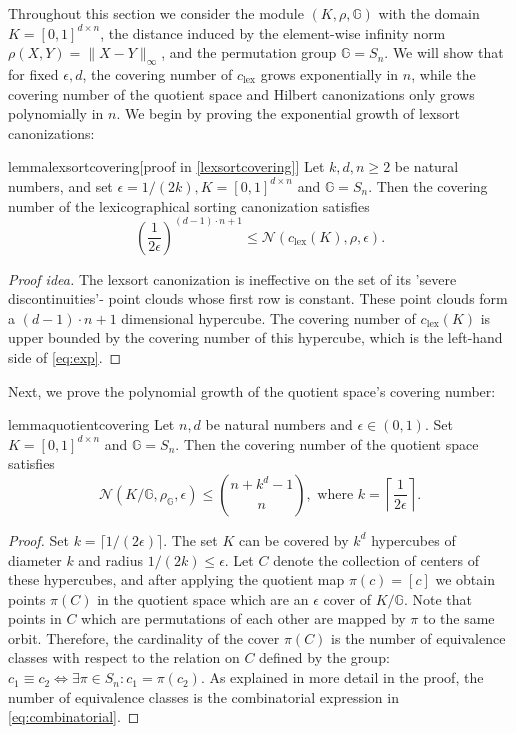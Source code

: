 \documentclass{article}
\theoremstyle{definition}
\theoremstyle{plain}
\newcommand{\G}{\mathbb{G}}
\newcommand{\N}{\mathcal{N}}
\newcommand{\csort}{c_{\mathrm{lex}}}
\begin{document}
Throughout this section we consider the module $(K,\rho,\G) $ with the domain $K=[0,1]^{d\times n}$, the distance induced by the element-wise infinity norm $\rho(X,Y)=\|X-Y\|_\infty $, and the permutation group $\G=S_n$. We  will show that for fixed $\epsilon,d$, the covering number of $\csort$ grows exponentially in $n$, while the covering number of the quotient space and Hilbert canonizations only grows polynomially in $n$. We begin by proving the exponential growth of lexsort canonizations:

\begin{restatable}{lemma}{lexsortcovering}[proof in \ref{lexsortcovering}]
\label{lem:lexsortcovering}
Let $k,d,n\geq 2$ be natural numbers, and set $\epsilon=1/(2k), K=[0,1]^{d\times n}$ and $\G=S_n$.    Then the covering number of the lexicographical sorting canonization satisfies 
\begin{equation}\label{eq:exp}\left( \frac{1}{2\epsilon}\right)^{(d-1)\cdot n + 1}\leq \N(\csort(K),\rho,\epsilon).\end{equation}
\end{restatable}
\begin{proof}[Proof idea]
The lexsort canonization is ineffective on the set of its 'severe discontinuities'- point clouds whose first row is constant. These point clouds form a $(d-1)\cdot n+1 $ dimensional hypercube. The covering number of $\csort(K)$ is upper bounded by the covering number of this hypercube, which is the left-hand side of \eqref{eq:exp}.
\end{proof}
Next, we prove the polynomial growth of the quotient space's covering number:
\begin{restatable}{lemma}{quotientcovering}
\label{lem:quotient_covering}
Let $n,d$ be natural numbers and $\epsilon\in (0,1)$. Set $K=[0,1]^{d\times n}$ and $\G=S_n$. Then the covering number of the quotient space satisfies
\begin{equation}\label{eq:combinatorial}
\N(K/\G,\rho_{\G},\epsilon)
\leq
\binom{n+k^{d}-1}{n},
\text{ where }
k=\left\lceil \frac{1}{2\epsilon} \right\rceil .
\end{equation}
\end{restatable}
\begin{proof}
Set $k=\lceil 1/(2\epsilon) \rceil $. The set $K$ can be covered by $k^d$ hypercubes of diameter $k$ and radius $1/(2k)\leq \epsilon $. Let $C$ denote the collection of centers of these hypercubes, and after applying the quotient map  $\pi(c) = [c]$ we obtain points $\pi(C)$ in the quotient space which are an $\epsilon$ cover of $K/\G$. Note that points in $C$ which are permutations of each other are mapped by $\pi$ to the same orbit. Therefore, the cardinality of the cover $\pi(C)$ is the number of equivalence classes with respect to the relation on $C$ defined by the group:  $c_1 \equiv c_2 \iff \exists \pi \in S_n : c_1 = \pi(c_2)$. As explained in more detail in the proof, the number of equivalence classes is the combinatorial expression in \eqref{eq:combinatorial}.  %
\end{proof}
\end{document}
